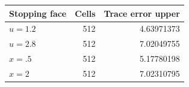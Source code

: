 \begin{tabular}{lrr}
\toprule
Stopping face & Cells & Trace error upper \\
\midrule
$u=1.2$ & 512 & 4.63971373 \\
$u=2.8$ & 512 & 7.02049755 \\
$x=.5$ & 512 & 5.17780198 \\
$x=2$ & 512 & 7.02310795 \\
\bottomrule
\end{tabular}
